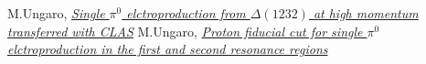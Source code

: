 \begin{thebibliography}{mybib}
                         {M.Ungaro},  \href{https://maureeungaro.github.io/home/meson/pi0_delta/pi0_delta}     {\it Single $\pi^0$ elctroproduction from $\Delta(1232)$ at high momentum transferred with CLAS}
     {M.Ungaro},  \href{https://maureeungaro.github.io/home/meson/pi0_resonance/proton_fid}{\it Proton fiducial cut for single $\pi^0$ elctroproduction in the first and second resonance regions}
\end{thebibliography}
